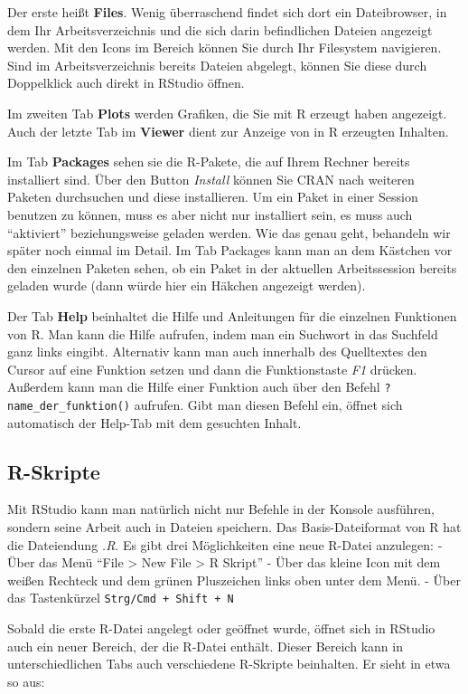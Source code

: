 \documentclass[
]{book}
\begin{document}
Der erste heißt \textbf{Files}. Wenig überraschend findet sich dort ein Dateibrowser, in dem Ihr Arbeitsverzeichnis und die sich darin befindlichen Dateien angezeigt werden.
Mit den Icons im Bereich können Sie durch Ihr Filesystem navigieren.
Sind im Arbeitsverzeichnis bereits Dateien abgelegt, können Sie diese durch Doppelklick auch direkt in RStudio öffnen.

Im zweiten Tab \textbf{Plots} werden Grafiken, die Sie mit R erzeugt haben angezeigt.
Auch der letzte Tab im \textbf{Viewer} dient zur Anzeige von in R erzeugten Inhalten.

Im Tab \textbf{Packages} sehen sie die R-Pakete, die auf Ihrem Rechner bereits installiert sind.
Über den Button \emph{Install} können Sie CRAN nach weiteren Paketen durchsuchen und diese installieren.
Um ein Paket in einer Session benutzen zu können, muss es aber nicht nur installiert sein, es muss auch ``aktiviert'' beziehungsweise geladen werden. Wie das genau geht, behandeln wir später noch einmal im Detail.
Im Tab Packages kann man an dem Kästchen vor den einzelnen Paketen sehen, ob ein Paket in der aktuellen Arbeitssession bereits geladen wurde (dann würde hier ein Häkchen angezeigt werden).

Der Tab \textbf{Help} beinhaltet die Hilfe und Anleitungen für die einzelnen Funktionen von R.
Man kann die Hilfe aufrufen, indem man ein Suchwort in das Suchfeld ganz links eingibt. Alternativ kann man auch innerhalb des Quelltextes den Cursor auf eine Funktion setzen und dann die Funktionstaste \emph{F1} drücken.
Außerdem kann man die Hilfe einer Funktion auch über den Befehl \texttt{?name\_der\_funktion()} aufrufen. Gibt man diesen Befehl ein, öffnet sich automatisch der Help-Tab mit dem gesuchten Inhalt.

\hypertarget{r-skripte}{%
\subsection{R-Skripte}\label{r-skripte}}

Mit RStudio kann man natürlich nicht nur Befehle in der Konsole ausführen, sondern seine Arbeit auch in Dateien speichern. Das Basis-Dateiformat von R hat die Dateiendung \emph{.R}. Es gibt drei Möglichkeiten eine neue R-Datei anzulegen:
- Über das Menü ``File \textgreater{} New File \textgreater{} R Skript''
- Über das kleine Icon mit dem weißen Rechteck und dem grünen Pluszeichen links oben unter dem Menü.
- Über das Tastenkürzel \texttt{Strg/Cmd\ +\ Shift\ +\ N}

Sobald die erste R-Datei angelegt oder geöffnet wurde, öffnet sich in RStudio auch ein neuer Bereich, der die R-Datei enthält. Dieser Bereich kann in unterschiedlichen Tabs auch verschiedene R-Skripte beinhalten. Er sieht in etwa so aus:
\end{document}
